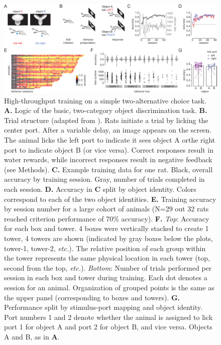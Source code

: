 \begin{figure}[t!]
    \includegraphics[width=\textwidth]{figures/chapter_1/fig_1-2_basic_training/fig_1-2_basic_training.pdf}
    \vspace{.1in}
    \caption[High-throughput training]{High-throughput training on a simple two-alternative choice task. 
    \textbf{A.} Logic of the basic, two-category object discrimination task. 
    \textbf{B.} Trial structure (adapted from \cite{Zoccolan2009}). Rats initiate a trial by licking the center port. After a variable delay, an image appears on the screen. The animal licks the left port to indicate it sees object A orthe right port to indicate object B (or vice versa). Correct responses result in water rewards, while incorrect responses result in negative feedback (see Methods). 
    \textbf{C.} Example training data for one rat. Black, overall accuracy by training session. Gray, number of trials completed in each session. 
    \textbf{D.} Accuracy in \textbf{C} split by object identity. Colors correspond to each of the two object identities.
    \textbf{E.} Training accuracy by session number for a large cohort of animals (N=29 out 32 rats reached criterion performance of 70\% accuracy). 
    \textbf{F.} \textit{Top}: Accuracy for each box and tower. 4 boxes were vertically stacked to create 1 tower, 4 towers are shown (indicated by gray boxes below the plots, tower-1, tower-2, \textit{etc.}). The relative position of each group within the tower represents the same physical location in each tower (top, second from the top, \textit{etc.}). \textit{Bottom}: Number of trials performed per session in each box and tower during training. Each dot denotes a session for an animal. Organization of grouped points is the same as the upper panel (corresponding to boxes and towers). 
    \textbf{G.} Performance split by stimulus-port mapping and object identity. Port numbers 1 and 2 denote whether the animal is assigned to lick port 1 for object A and port 2 for object B, and vice versa. Objects A and B, as in \textbf{A}.
    \label{fig:basic_training}}
\end{figure}

